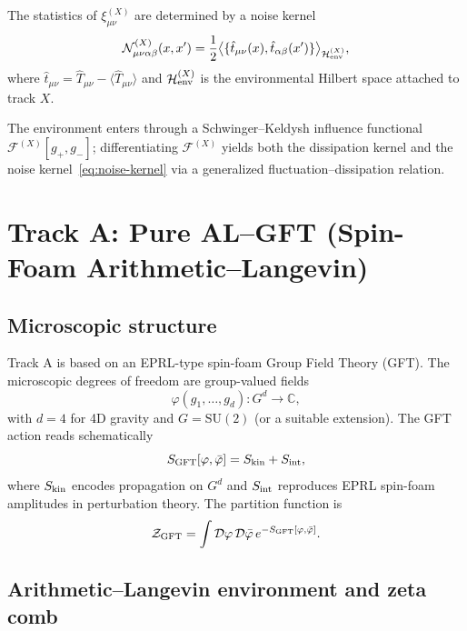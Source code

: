 \documentclass[11pt]{article}
\begin{document}
The statistics of $\xi^{(X)}_{\mu\nu}$ are determined by a noise kernel
\begin{equation}
  \mathcal{N}^{(X)}_{\mu\nu\alpha\beta}(x,x')
  = \frac{1}{2}
    \big\langle \{\hat{t}_{\mu\nu}(x),\hat{t}_{\alpha\beta}(x')\} \big\rangle_{\mathcal{H}_{\rm env}^{(X)}},
  \label{eq:noise-kernel}
\end{equation}
where $\hat{t}_{\mu\nu} = \hat{T}_{\mu\nu} - \langle \hat{T}_{\mu\nu}\rangle$ and $\mathcal{H}_{\rm env}^{(X)}$ is the environmental Hilbert space attached to track $X$.

The environment enters through a Schwinger--Keldysh influence functional $\mathcal{F}^{(X)}[g_{+},g_{-}]$; differentiating $\mathcal{F}^{(X)}$ yields both the dissipation kernel and the noise kernel~\eqref{eq:noise-kernel} via a generalized fluctuation--dissipation relation.

\section{Track A: Pure AL--GFT (Spin-Foam Arithmetic--Langevin)}

\subsection{Microscopic structure}

Track A is based on an EPRL-type spin-foam Group Field Theory (GFT). The microscopic degrees of freedom are group-valued fields
\begin{equation}
  \varphi(g_1,\dots,g_d): G^d \to \mathbb{C},
\end{equation}
with $d=4$ for 4D gravity and $G=\mathrm{SU}(2)$ (or a suitable extension). The GFT action reads schematically
\begin{equation}
  S_{\rm GFT}[\varphi,\bar{\varphi}] = S_{\rm kin} + S_{\rm int},
\end{equation}
where $S_{\rm kin}$ encodes propagation on $G^d$ and $S_{\rm int}$ reproduces EPRL spin-foam amplitudes in perturbation theory. The partition function is
\begin{equation}
  \mathcal{Z}_{\rm GFT} = \int \mathcal{D}\varphi\,\mathcal{D}\bar{\varphi}\, e^{-S_{\rm GFT}[\varphi,\bar{\varphi}]}.
\end{equation}

\subsection{Arithmetic--Langevin environment and zeta comb}
\end{document}
